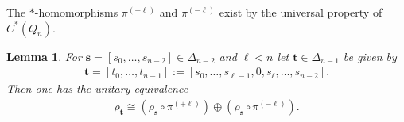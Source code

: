 \documentclass[a4paper]{amsart}
\newtheorem{lemma}[thm]{Lemma}
\begin{document}
The $\ast$-homomorphisms $\pi^{(+\ell)}$ and $\pi^{(-\ell)}$ exist by the universal property of $C^\ast(Q_n)$.

\begin{lemma}
    \label{reps::lemma:decomposition_of_rho_t_for_boundary_points}
    For $\mathbf{s} = [s_0, \dots, s_{n-2}] \in \Delta_{n-2}$ and $\ell < n$ let $\mathbf{t} \in \Delta_{n-1}$ be given by
    \begin{align*}
        \mathbf{t} = [t_0, \dots, t_{n-1}] := [s_0, \dots, s_{\ell-1}, 0, s_\ell, \dots, s_{n-2}].
    \end{align*}
    Then one has the unitary equivalence
    \begin{align*}
        \rho_\mathbf{t} \cong \left(\rho_\mathbf{s} \circ \pi^{(+\ell)}\right) \oplus \left(\rho_\mathbf{s} \circ \pi^{(-\ell)}\right).
    \end{align*}
\end{lemma}
\end{document}
